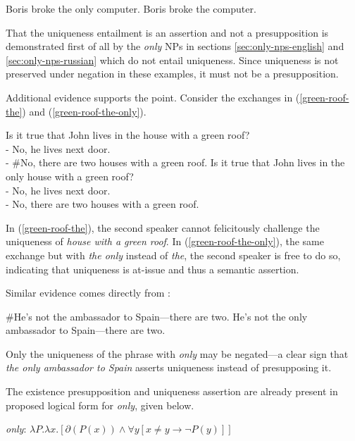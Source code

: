 \begin{exe}
	\ex \label{feckless-boris} Boris broke the only computer.
	\ex \label{feckless-boris2} Boris broke the computer.
\end{exe}

That the uniqueness entailment is an assertion and not a presupposition is demonstrated first of all by the \textit{only} NPs in sections \ref{sec:only-nps-english} and \ref{sec:only-nps-russian} which do not entail uniqueness. Since uniqueness is not preserved under negation in these examples, it must not be a presupposition.

Additional evidence supports the point. Consider the exchanges in (\ref{green-roof-the}) and (\ref{green-roof-the-only}).

\begin{exe}
	\ex \label{green-roof-the} Is it true that John lives in the house with a green roof? \\
	    - No, he lives next door. \\
	    - \#No, there are two houses with a green roof.
	\ex \label{green-roof-the-only} Is it true that John lives in the only house with a green roof? \\
	    - No, he lives next door. \\
	    - No, there are two houses with a green roof.
\end{exe}

In (\ref{green-roof-the}), the second speaker cannot felicitously challenge the uniqueness of \textit{house with a green roof}. In (\ref{green-roof-the-only}), the same exchange but with \textit{the only} instead of \textit{the}, the second speaker is free to do so, indicating that uniqueness is at-issue and thus a semantic assertion.

Similar evidence comes directly from \citet{cb2015}:

\begin{exe}
	\ex \#He's not the ambassador to Spain---there are two.
	\ex He's not the only ambassador to Spain---there are two.
\end{exe}

Only the uniqueness of the phrase with \textit{only} may be negated---a clear sign that \textit{the only ambassador to Spain} asserts uniqueness instead of presupposing it.

The existence presupposition and uniqueness assertion are already present in  proposed logical form for \textit{only}, given below.

\begin{exe}
	\ex \label{only-lf} \textit{only}: $ \lambda P . \lambda x . [ \partial(P(x)) \land \forall y [ x \ne y \to \neg P(y) ] ] $
\end{exe}

